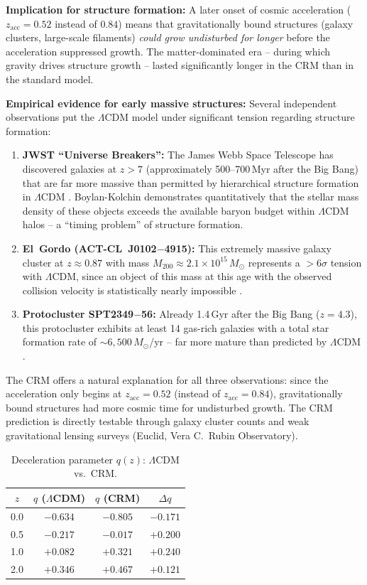 \documentclass[aps,prd,twocolumn,superscriptaddress,nofootinbib]{revtex4-2}
\begin{document}
\textbf{Implication for structure formation:} A later onset of cosmic acceleration ($z_{\mathrm{acc}} = 0.52$ instead of $0.84$) means that gravitationally bound structures (galaxy clusters, large-scale filaments) \textit{could grow undisturbed for longer} before the acceleration suppressed growth. The matter-dominated era -- during which gravity drives structure growth -- lasted significantly longer in the CRM than in the standard model.

\textbf{Empirical evidence for early massive structures:} Several independent observations put the $\Lambda$CDM model under significant tension regarding structure formation:
\begin{enumerate}
\item \textbf{JWST ``Universe Breakers'':} The James Webb Space Telescope has discovered galaxies at $z > 7$ (approximately 500--700\,Myr after the Big Bang) that are far more massive than permitted by hierarchical structure formation in $\Lambda$CDM \cite{Labbe2023}. Boylan-Kolchin \cite{BoylanKolchin2023} demonstrates quantitatively that the stellar mass density of these objects exceeds the available baryon budget within $\Lambda$CDM halos -- a ``timing problem'' of structure formation.
\item \textbf{El~Gordo (ACT-CL~J0102$-$4915):} This extremely massive galaxy cluster at $z \approx 0.87$ with mass $M_{200} \approx 2.1 \times 10^{15}\,M_\odot$ represents a $> 6\sigma$ tension with $\Lambda$CDM, since an object of this mass at this age with the observed collision velocity is statistically nearly impossible \cite{Asencio2023}.
\item \textbf{Protocluster SPT2349$-$56:} Already 1.4\,Gyr after the Big Bang ($z = 4.3$), this protocluster exhibits at least 14 gas-rich galaxies with a total star formation rate of $\sim\!6{,}500\,M_\odot$/yr -- far more mature than predicted by $\Lambda$CDM \cite{Miller2018}.
\end{enumerate}

The CRM offers a natural explanation for all three observations: since the acceleration only begins at $z_{\mathrm{acc}} = 0.52$ (instead of $z_{\mathrm{acc}} = 0.84$), gravitationally bound structures had more cosmic time for undisturbed growth. The CRM prediction is directly testable through galaxy cluster counts and weak gravitational lensing surveys (Euclid, Vera C.\ Rubin Observatory).

\begin{table}[htbp]
\centering
\caption{Deceleration parameter $q(z)$: $\Lambda$CDM vs.\ CRM.}
\label{tab:qz}
\begin{tabular}{cccc}
\toprule
$z$ & $q$ ($\Lambda$CDM) & $q$ (CRM) & $\Delta q$ \\
\midrule
0.0 & $-0.634$ & $-0.805$ & $-0.171$ \\
0.5 & $-0.217$ & $-0.017$ & $+0.200$ \\
1.0 & $+0.082$ & $+0.321$ & $+0.240$ \\
2.0 & $+0.346$ & $+0.467$ & $+0.121$ \\
\bottomrule
\end{tabular}
\end{table}
\end{document}
